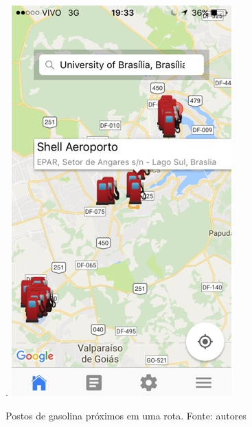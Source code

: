 \begin{figure}[H]
    \centering.
    \includegraphics[scale=0.5]{figuras/app_5.jpg}
    \caption[Postos de gasolina próximos em uma rota]{Postos de gasolina próximos em uma rota. Fonte: autores}
    \label{img:postos_de_gasolina_proximos_em_uma_rota}
\end{figure}
